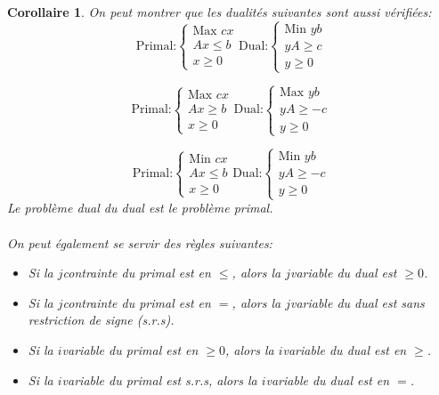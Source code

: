 \documentclass[a4paper]{report}
\theoremstyle{definition}
\theoremstyle{remark}
\theoremstyle{plain}
\newtheorem{corollary}{Corollaire}
\begin{document}
\begin{corollary}
On peut montrer que les dualités suivantes sont aussi vérifiées:
\[\text{Primal:}
\begin{cases}
	\text{Max } cx \\
	Ax\le b \\
	x \ge 0
\end{cases}
\text{Dual:}\begin{cases}
\text{Min } yb\\
yA\ge c\\
y\ge 0
\end{cases}\]

\[\text{Primal:}
\begin{cases}
	\text{Max } cx \\
	Ax\ge b \\
	x \ge 0
\end{cases}
\text{Dual:}\begin{cases}
\text{Max } yb\\
yA\ge -c\\
y\ge 0
\end{cases}\]

\[\text{Primal:}
\begin{cases}
	\text{Min } cx \\
	Ax\le b \\
	x \ge 0
\end{cases}
\text{Dual:}\begin{cases}
\text{Min } yb\\
yA\ge -c\\
y\ge 0
\end{cases}\]
Le problème dual du dual est le problème primal.

\paragraph{}
On peut également se servir des règles suivantes:
\begin{itemize}
	\item Si la \(j\)\ieme contrainte du primal est en \(\le\), alors la
		\(j\)\ieme variable du dual est \(\ge 0\).
	\item Si la \(j\)\ieme contrainte du primal est en \(=\), alors la
		\(j\)\ieme variable du dual est sans restriction de signe (s.r.s).
	\item Si la \(i\)\ieme variable du primal est en \(\ge 0\), alors la
		\(i\)\ieme variable du dual est en \(\ge\).
	\item Si la \(i\)\ieme variable du primal est s.r.s, alors la
		\(i\)\ieme variable du dual est en \(=\).
\end{itemize}
\end{corollary}
\end{document}

